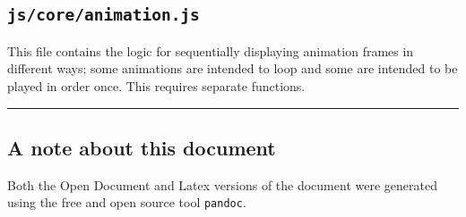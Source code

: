 \documentclass[11pt]{article}
\begin{document}
\subsection{\texttt{js/core/animation.js}}
\label{sec:org8edb051}
This file contains the logic for sequentially displaying animation frames in different ways; some animations are intended to loop and some are intended to be played in order once. This requires separate functions.\\

\noindent\rule{\textwidth}{0.5pt}
\subsection{A note about this document}
\label{sec:org2c05ad5}
Both the Open Document and Latex versions of the document were generated using the free and open source tool \texttt{pandoc}.\\
\end{document}
